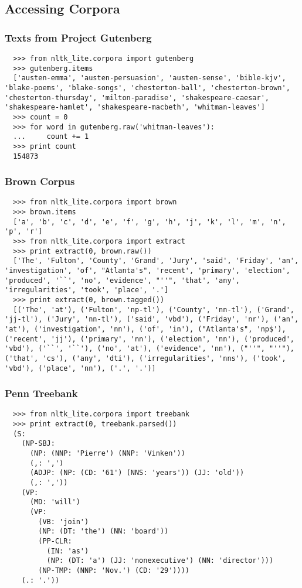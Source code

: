 \documentclass{beamer}             %
\begin{document}
\subsection{Accessing Corpora}

\begin{frame}[fragile]
\frametitle{Texts from Project Gutenberg}

\begin{verbatim}
  >>> from nltk_lite.corpora import gutenberg
  >>> gutenberg.items
  ['austen-emma', 'austen-persuasion', 'austen-sense', 'bible-kjv', 'blake-poems', 'blake-songs', 'chesterton-ball', 'chesterton-brown', 'chesterton-thursday', 'milton-paradise', 'shakespeare-caesar', 'shakespeare-hamlet', 'shakespeare-macbeth', 'whitman-leaves']
  >>> count = 0
  >>> for word in gutenberg.raw('whitman-leaves'):
  ...     count += 1
  >>> print count
  154873
\end{verbatim}
\end{frame}

\begin{frame}[fragile]
\frametitle{Brown Corpus}
\small

\begin{verbatim}
  >>> from nltk_lite.corpora import brown
  >>> brown.items
  ['a', 'b', 'c', 'd', 'e', 'f', 'g', 'h', 'j', 'k', 'l', 'm', 'n', 'p', 'r']
  >>> from nltk_lite.corpora import extract
  >>> print extract(0, brown.raw())
  ['The', 'Fulton', 'County', 'Grand', 'Jury', 'said', 'Friday', 'an', 'investigation', 'of', "Atlanta's", 'recent', 'primary', 'election', 'produced', '``', 'no', 'evidence', "''", 'that', 'any', 'irregularities', 'took', 'place', '.']
  >>> print extract(0, brown.tagged())
  [('The', 'at'), ('Fulton', 'np-tl'), ('County', 'nn-tl'), ('Grand', 'jj-tl'), ('Jury', 'nn-tl'), ('said', 'vbd'), ('Friday', 'nr'), ('an', 'at'), ('investigation', 'nn'), ('of', 'in'), ("Atlanta's", 'np$'), ('recent', 'jj'), ('primary', 'nn'), ('election', 'nn'), ('produced', 'vbd'), ('``', '``'), ('no', 'at'), ('evidence', 'nn'), ("''", "''"), ('that', 'cs'), ('any', 'dti'), ('irregularities', 'nns'), ('took', 'vbd'), ('place', 'nn'), ('.', '.')]
\end{verbatim}
\end{frame}


\begin{frame}[fragile]
\frametitle{Penn Treebank}
\small

\begin{verbatim}
  >>> from nltk_lite.corpora import treebank
  >>> print extract(0, treebank.parsed())
  (S:
    (NP-SBJ:
      (NP: (NNP: 'Pierre') (NNP: 'Vinken'))
      (,: ',')
      (ADJP: (NP: (CD: '61') (NNS: 'years')) (JJ: 'old'))
      (,: ','))
    (VP:
      (MD: 'will')
      (VP:
        (VB: 'join')
        (NP: (DT: 'the') (NN: 'board'))
        (PP-CLR:
          (IN: 'as')
          (NP: (DT: 'a') (JJ: 'nonexecutive') (NN: 'director')))
        (NP-TMP: (NNP: 'Nov.') (CD: '29'))))
    (.: '.'))
\end{verbatim}
\end{frame}
\end{document}
